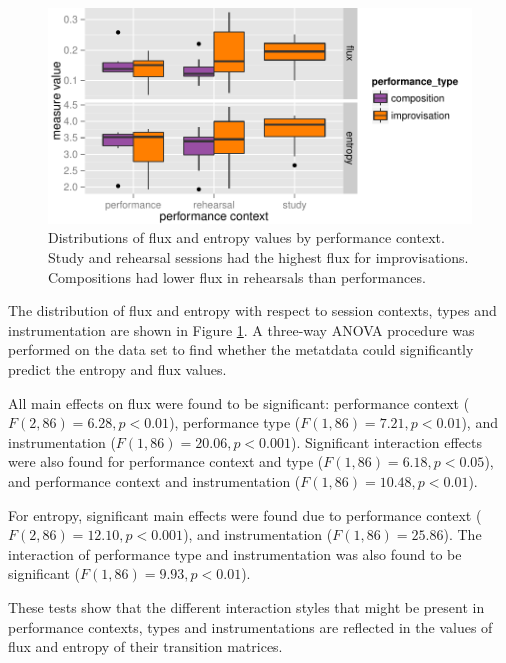 \documentclass{sigchi}
\begin{document}
\begin{figure} \centering
  \includegraphics[width=\linewidth]{figures/context-flux-entropy-boxplot}
  \caption{Distributions of flux and entropy values by performance
context. Study and rehearsal sessions had the highest flux for
improvisations. Compositions had lower
flux in rehearsals than performances.
\label{fig:flux-entropy-boxplot}}
\end{figure}

The distribution of flux and entropy with respect to session contexts,
types and instrumentation are shown in Figure
\ref{fig:flux-entropy-boxplot}. A three-way ANOVA procedure was
performed on the data set to find whether the metatdata could
significantly predict the entropy and flux values.

All main effects on flux were found to be significant: performance
context ($F(2,86) = 6.28, p < 0.01$), performance type
($F(1,86) = 7.21, p < 0.01$), and instrumentation
($F(1,86) = 20.06, p < 0.001$). Significant interaction effects were
also found for performance context and type
($F(1,86) = 6.18, p < 0.05$), and performance context and
instrumentation ($F(1,86) = 10.48, p < 0.01$).

For entropy, significant main effects were found due to performance
context ($F(2,86) = 12.10, p < 0.001$), and instrumentation
($F(1,86) = 25.86$). The interaction of performance type and
instrumentation was also found to be significant
($F(1,86) = 9.93, p<0.01$).

These tests show that the different interaction styles that might be
present in performance contexts, types and instrumentations are
reflected in the values of flux and entropy of their transition
matrices.
\end{document}
